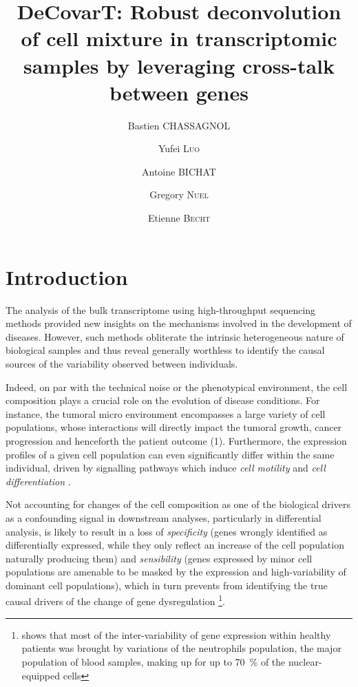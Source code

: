 \documentclass[long, final]{jobim}
\title{DeCovarT: Robust deconvolution of cell mixture in transcriptomic samples by leveraging cross-talk between genes}
\author{Bastien \textsc{CHASSAGNOL}\inst{1, 2}  \and Yufei \textsc{Luo}\inst{1} \and Antoine \textsc{BICHAT}\inst{1} \and Gregory \textsc{Nuel}\inst{2} \and Etienne \textsc{Becht}\inst{1}}
\institute{
 Les Laboratoires Servier, 50 Rue Carnot, 92150, Suresnes, France
 \and
 LPSM (Laboratoire de Probabilités, Statistiques et Modélisation),  4 place Jussieu, 75005, Paris, France
}
\begin{document}

\maketitle

 \section{Introduction}
 \label{sec:introduction}

The analysis of the bulk transcriptome using high-throughput sequencing methods provided new insights on the mechanisms involved in the development of diseases. However, such methods obliterate the intrinsic heterogeneous nature of biological samples and thus reveal generally worthless to identify the causal sources of the variability observed between individuals. 

Indeed, on par with the technical noise or the phenotypical environment, the cell composition plays a crucial role on the evolution of disease conditions. For instance, the tumoral micro environment encompasses a large variety of cell populations, whose interactions will directly impact the tumoral growth, cancer progression and henceforth the patient outcome (1). Furthermore, the expression profiles of a given cell population can even significantly differ within the same individual, driven by signalling pathways which induce \textit{cell motility} and \textit{cell differentiation} \cite{shoemaker_etal12}. 

Not accounting for changes of the cell composition as one of the biological drivers as a confounding signal in downstream analyses, particularly in differential analysis, is likely to result in a loss of \textit{specificity} (genes wrongly identified as differentially expressed, while they only reflect an increase of the cell population naturally producing them) and \textit{sensibility} (genes expressed by minor cell populations are amenable to be masked by the expression and high-variability of dominant cell populations), which in turn prevents from identifying the true causal drivers of the change of gene dysregulation \footnote{\cite{whitney_etal03} shows that most of the inter-variability of gene expression within healthy patients was brought by variations of the neutrophils population, the major population of blood samples, making up for up to \qty{70}{\percent} of the nuclear-equipped cells}.
\end{document}
